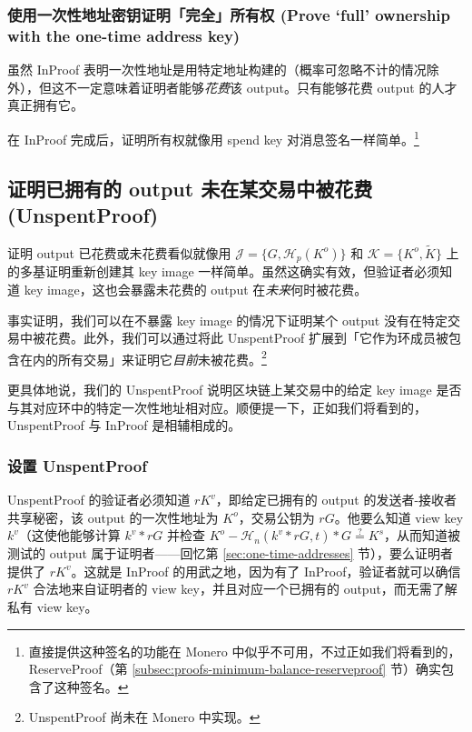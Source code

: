 \subsubsection*{使用一次性地址密钥证明「完全」所有权 (Prove `full' ownership with the one-time address key)}

虽然 InProof 表明一次性地址是用特定地址构建的（概率可忽略不计的情况除外），但这不一定意味着证明者能够{\em 花费}该 output。只有能够花费 output 的人才真正拥有它。

在 InProof 完成后，证明所有权就像用 spend key 对消息签名一样简单。\footnote{直接提供这种签名的功能在 Monero 中似乎不可用，不过正如我们将看到的，ReserveProof（第 \ref{subsec:proofs-minimum-balance-reserveproof} 节）确实包含了这种签名。}


\subsection{证明已拥有的 output 未在某交易中被花费 (UnspentProof)}
\label{subsec:proofs-owned-output-spent-unspentproof}

证明 output 已花费或未花费看似就像用 $\mathcal{J} = \{G,\mathcal{H}_p(K^o)\}$ 和 $\mathcal{K} = \{K^o,\tilde{K}\}$ 上的多基证明重新创建其 key image 一样简单。虽然这确实有效，但验证者必须知道 key image，这也会暴露未花费的 output 在{\em 未来}何时被花费。

事实证明，我们可以在不暴露 key image 的情况下证明某个 output 没有在特定交易中被花费。此外，我们可以通过将此 UnspentProof \cite{unspent-proof-issue-68} 扩展到「它作为环成员被包含在内的所有交易」来证明它{\em 目前}未被花费。\footnote{UnspentProof 尚未在 Monero 中实现。}

更具体地说，我们的 UnspentProof 说明区块链上某交易中的给定 key image 是否与其对应环中的特定一次性地址相对应。顺便提一下，正如我们将看到的，UnspentProof 与 InProof 是相辅相成的。

\subsubsection*{设置 UnspentProof}

UnspentProof 的验证者必须知道 $r K^v$，即给定已拥有的 output 的发送者-接收者共享秘密，该 output 的一次性地址为 $K^o$，交易公钥为 $r G$。他要么知道 view key $k^v$（这使他能够计算 $k^v*r G$ 并检查 $K^o - \mathcal{H}_n(k^v*rG,t)*G \stackrel{?}{=} K^s$，从而知道被测试的 output 属于证明者——回忆第 \ref{sec:one-time-addresses} 节），要么证明者提供了 $r K^v$。这就是 InProof 的用武之地，因为有了 InProof，验证者就可以确信 $r K^v$ 合法地来自证明者的 view key，并且对应一个已拥有的 output，而无需了解私有 view key。

